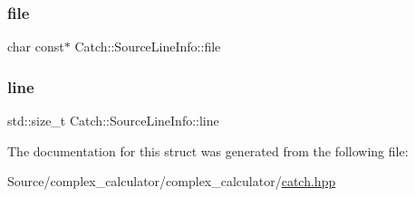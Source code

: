 \subsubsection{\texorpdfstring{file}{file}}
{\footnotesize\ttfamily char const$\ast$ Catch\+::\+Source\+Line\+Info\+::file}

\mbox{\label{struct_catch_1_1_source_line_info_a841e5d696c7b9cde24e45e61dd979c77}} 
\subsubsection{\texorpdfstring{line}{line}}
{\footnotesize\ttfamily std\+::size\+\_\+t Catch\+::\+Source\+Line\+Info\+::line}



The documentation for this struct was generated from the following file\+:\begin{DoxyCompactItemize}
\item 
Source/complex\+\_\+calculator/complex\+\_\+calculator/\mbox{\hyperlink{catch_8hpp}{catch.\+hpp}}\end{DoxyCompactItemize}
